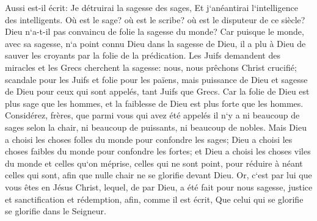 \verse Aussi est-il écrit: Je détruirai la sagesse des sages, Et j`anéantirai l`intelligence des intelligents. 
\verse Où est le sage? où est le scribe? où est le disputeur de ce siècle? Dieu n`a-t-il pas convaincu de folie la sagesse du monde? 
\verse Car puisque le monde, avec sa sagesse, n`a point connu Dieu dans la sagesse de Dieu, il a plu à Dieu de sauver les croyants par la folie de la prédication. 
\verse Les Juifs demandent des miracles et les Grecs cherchent la sagesse: 
\verse nous, nous prêchons Christ crucifié; scandale pour les Juifs et folie pour les païens, 
\verse mais puissance de Dieu et sagesse de Dieu pour ceux qui sont appelés, tant Juifs que Grecs. 
\verse Car la folie de Dieu est plus sage que les hommes, et la faiblesse de Dieu est plus forte que les hommes. 
\verse Considérez, frères, que parmi vous qui avez été appelés il n`y a ni beaucoup de sages selon la chair, ni beaucoup de puissants, ni beaucoup de nobles. 
\verse Mais Dieu a choisi les choses folles du monde pour confondre les sages; Dieu a choisi les choses faibles du monde pour confondre les fortes; 
\verse et Dieu a choisi les choses viles du monde et celles qu`on méprise, celles qui ne sont point, pour réduire à néant celles qui sont, 
\verse afin que nulle chair ne se glorifie devant Dieu. 
\verse Or, c`est par lui que vous êtes en Jésus Christ, lequel, de par Dieu, a été fait pour nous sagesse, justice et sanctification et rédemption, 
\verse afin, comme il est écrit, Que celui qui se glorifie se glorifie dans le Seigneur. 


